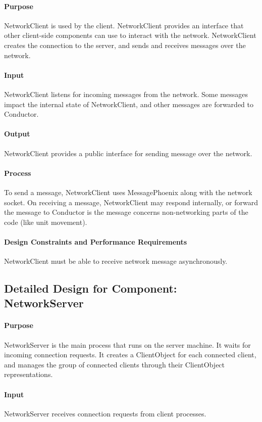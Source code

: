 \documentclass[12pt,a4paper,titlepage]{article}
\begin{document}
\paragraph{Purpose} NetworkClient is used by the client. NetworkClient provides an interface that other client-side components can use to interact with the network. NetworkClient creates the connection to the server, and sends and receives messages over the network.
\paragraph{Input} NetworkClient listens for incoming messages from the network. Some messages impact the internal state of NetworkClient, and other messages are forwarded to Conductor.
\paragraph{Output} NetworkClient provides a public interface for sending message over the network.
\paragraph{Process} To send a message, NetworkClient uses MessagePhoenix along with the network socket. On receiving a message, NetworkClient may respond internally, or forward the message to Conductor is the message concerns non-networking parts of the code (like unit movement).
\paragraph{Design Constraints and Performance Requirements}
NetworkClient must be able to receive network message asynchronously. 

\subsection{Detailed Design for Component: NetworkServer }
\paragraph{Purpose} NetworkServer is the main process that runs on the server machine. It waits for incoming connection requests. It creates a ClientObject for each connected client, and manages the group of connected clients through their ClientObject representations. 
\paragraph{Input} NetworkServer receives connection requests from client processes.
\end{document}

